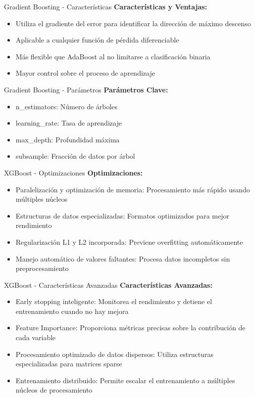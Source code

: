 \documentclass{beamer}
\begin{document}
\begin{frame}{Gradient Boosting - Características}
    \textbf{Características y Ventajas:}
    \begin{itemize}
        \item Utiliza el gradiente del error para identificar la dirección de máximo descenso
        \item Aplicable a cualquier función de pérdida diferenciable
        \item Más flexible que AdaBoost al no limitarse a clasificación binaria
        \item Mayor control sobre el proceso de aprendizaje
    \end{itemize}
\end{frame}

\begin{frame}{Gradient Boosting - Parámetros}
    \textbf{Parámetros Clave:}
    \begin{itemize}
        \item n\_estimators: Número de árboles
        \item learning\_rate: Tasa de aprendizaje
        \item max\_depth: Profundidad máxima
        \item subsample: Fracción de datos por árbol
    \end{itemize}
\end{frame}

\begin{frame}{XGBoost - Optimizaciones}
    \textbf{Optimizaciones:}
    \begin{itemize}
        \item Paralelización y optimización de memoria: Procesamiento más rápido usando múltiples núcleos
        \item Estructuras de datos especializadas: Formatos optimizados para mejor rendimiento
        \item Regularización L1 y L2 incorporada: Previene overfitting automáticamente
        \item Manejo automático de valores faltantes: Procesa datos incompletos sin preprocesamiento
    \end{itemize}
\end{frame}

\begin{frame}{XGBoost - Características Avanzadas}
    \textbf{Características Avanzadas:}
    \begin{itemize}
        \item Early stopping inteligente: Monitorea el rendimiento y detiene el entrenamiento cuando no hay mejora
        \item Feature Importance: Proporciona métricas precisas sobre la contribución de cada variable
        \item Procesamiento optimizado de datos dispersos: Utiliza estructuras especializadas para matrices sparse
        \item Entrenamiento distribuido: Permite escalar el entrenamiento a múltiples núcleos de procesamiento
    \end{itemize}
\end{frame}
\end{document}

